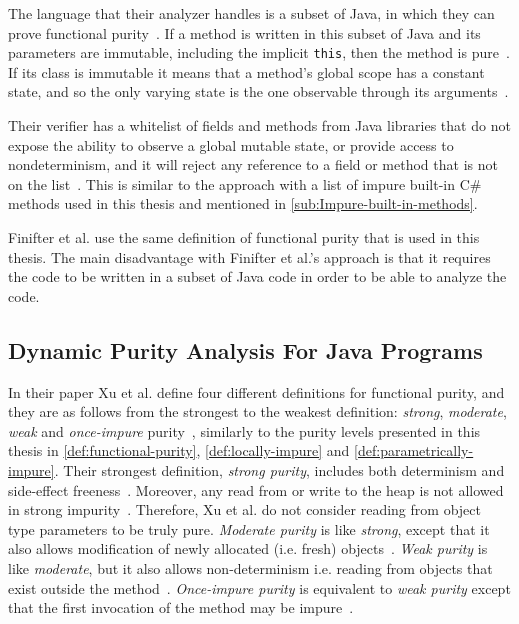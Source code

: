 \documentclass[a4paper,12pt]{article}
\begin{document}
The language that their analyzer handles is a subset of Java, in which they can prove functional purity~\cite{purity-in-java}. If a method is written in this subset of Java and its parameters are immutable, including the implicit \texttt{this}, then the method is pure~\cite{purity-in-java}. %
If its class is immutable it means that a method's global scope has a constant state, and so the only varying state is the one observable through its arguments~\cite{purity-in-java}.

Their verifier has a whitelist of fields and methods from Java libraries that do not expose the ability to observe a global mutable state, or provide access to nondeterminism, and it will reject any reference to a field or method that is not on the list~\cite{purity-in-java}. This is similar to the approach with a list of impure built-in C\# methods used in this thesis and mentioned in \autoref{sub:Impure-built-in-methods}.

Finifter et al. use the same definition of functional purity that is used in this thesis. The main disadvantage with Finifter et al.'s approach is that it requires the code to be written in a subset of Java code in order to be able to analyze the code.

\subsection{Dynamic Purity Analysis For Java Programs} \label{sub:Dynamic Purity Analysis For Java Programs}

In their paper Xu et al. define four different definitions for functional purity, and they are as follows from the strongest to the weakest definition: \textit{strong}, \textit{moderate}, \textit{weak} and \textit{once-impure} purity~\cite{xu2007dynamic}, similarly to the purity levels presented in this thesis in \autoref{def:functional-purity}, \autoref{def:locally-impure} and \autoref{def:parametrically-impure}. Their strongest definition, \textit{strong purity}, includes both determinism and side-effect freeness~\cite{xu2007dynamic}. Moreover, any read from or write to the heap is not allowed in strong impurity~\cite{xu2007dynamic}. Therefore, Xu et al. do not consider reading from object type parameters to be truly pure. \textit{Moderate purity} is like \textit{strong}, except that it also allows modification of newly allocated (i.e. fresh) objects~\cite{xu2007dynamic}. \textit{Weak purity} is like \textit{moderate}, but it also allows non-determinism i.e. reading from objects that exist outside the method~\cite{xu2007dynamic}. \textit{Once-impure purity} is equivalent to \textit{weak purity} except that the first invocation of the method may be impure~\cite{xu2007dynamic}.
\end{document}
